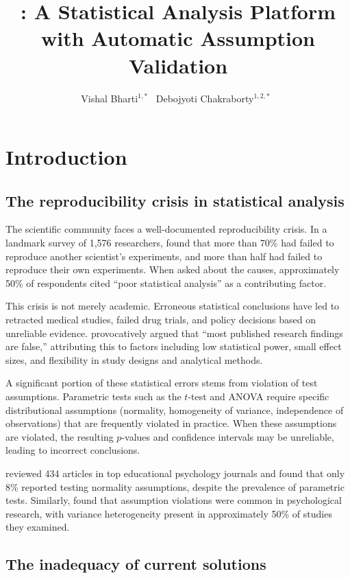 \documentclass[article]{jss}
\author{
  Vishal Bharti$^{1,*}$~\orcidicon{0009-0003-1431-4457}
  \And
  Debojyoti Chakraborty$^{1,2,*}$~\orcidicon{0000-0003-1460-7594}
}
\title{\pkg{StickForStats}: A Statistical Analysis Platform with Automatic Assumption Validation}
\begin{document}

\section{Introduction} \label{sec:intro}

\subsection{The reproducibility crisis in statistical analysis}

The scientific community faces a well-documented reproducibility crisis. In a landmark survey of 1,576 researchers, \citet{baker2016reproducibility} found that more than 70\% had failed to reproduce another scientist's experiments, and more than half had failed to reproduce their own experiments. When asked about the causes, approximately 50\% of respondents cited ``poor statistical analysis'' as a contributing factor.

This crisis is not merely academic. Erroneous statistical conclusions have led to retracted medical studies, failed drug trials, and policy decisions based on unreliable evidence. \citet{ioannidis2005why} provocatively argued that ``most published research findings are false,'' attributing this to factors including low statistical power, small effect sizes, and flexibility in study designs and analytical methods.

A significant portion of these statistical errors stems from violation of test assumptions. Parametric tests such as the $t$-test and ANOVA require specific distributional assumptions (normality, homogeneity of variance, independence of observations) that are frequently violated in practice. When these assumptions are violated, the resulting $p$-values and confidence intervals may be unreliable, leading to incorrect conclusions.

\citet{osborne2010improving} reviewed 434 articles in top educational psychology journals and found that only 8\% reported testing normality assumptions, despite the prevalence of parametric tests. Similarly, \citet{keselman1998statistical} found that assumption violations were common in psychological research, with variance heterogeneity present in approximately 50\% of studies they examined.

\subsection{The inadequacy of current solutions}
\end{document}
